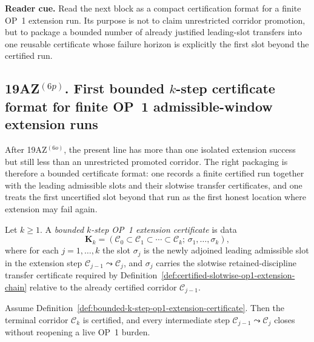 \noindent\textbf{Reader cue.} Read the next block as a compact certification format for a finite OP~1 extension run. Its purpose is not to claim unrestricted corridor promotion, but to package a bounded number of already justified leading-slot transfers into one reusable certificate whose failure horizon is explicitly the first slot beyond the certified run.

\subsection*{19AZ$^{(6p)}$. First bounded $k$-step certificate format for finite OP~1 admissible-window extension runs}
\label{sec:first-bounded-k-step-certificate-format-for-finite-op1-admissible-window-extension-runs}
After 19AZ$^{(6o)}$, the present line has more than one isolated extension success but still less than an unrestricted promoted corridor. The right packaging is therefore a bounded certificate format: one records a finite certified run together with the leading admissible slots and their slotwise transfer certificates, and one treats the first uncertified slot beyond that run as the first honest location where extension may fail again.

\begin{definition}
\label{def:bounded-k-step-op1-extension-certificate}
Let $k\ge 1$. A \emph{bounded $k$-step OP~1 extension certificate} is data
\[
  \mathbf K_k=(\mathcal C_0\subset\mathcal C_1\subset\cdots\subset\mathcal C_k;\,\sigma_1,\dots,\sigma_k),
\]
where for each $j=1,\dots,k$ the slot $\sigma_j$ is the newly adjoined leading admissible slot in the extension step $\mathcal C_{j-1}\leadsto \mathcal C_j$, and $\sigma_j$ carries the slotwise retained-discipline transfer certificate required by Definition~\ref{def:certified-slotwise-op1-extension-chain} relative to the already certified corridor $\mathcal C_{j-1}$.
\end{definition}

\begin{proposition}
\label{prop:bounded-k-step-certificates-certify-whole-finite-op1-run}
Assume Definition~\ref{def:bounded-k-step-op1-extension-certificate}. Then the terminal corridor $\mathcal C_k$ is certified, and every intermediate step $\mathcal C_{j-1}\leadsto \mathcal C_j$ closes without reopening a live OP~1 burden.
\end{proposition}

